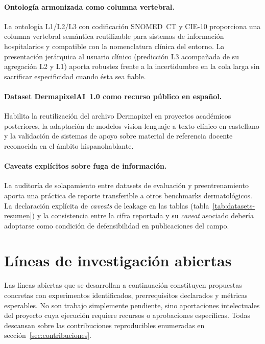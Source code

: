 \paragraph{Ontología armonizada como columna vertebral.}
La ontología L1/L2/L3 con codificación SNOMED~CT y CIE-10
proporciona una columna vertebral semántica reutilizable para
sistemas de información hospitalarios y compatible con la
nomenclatura clínica del entorno. La presentación jerárquica al
usuario clínico (predicción L3 acompañada de su agregación L2 y
L1) aporta robustez frente a la incertidumbre en la cola larga sin
sacrificar especificidad cuando ésta sea fiable.

\paragraph{Dataset DermapixelAI~1.0 como recurso público en español.}
Habilita la reutilización del archivo Dermapixel en proyectos
académicos posteriores, la adaptación de modelos vision-lenguaje a
texto clínico en castellano y la validación de sistemas de apoyo
sobre material de referencia docente reconocida en el ámbito
hispanohablante.

\paragraph{Caveats explícitos sobre fuga de información.}
La auditoría de solapamiento entre datasets de evaluación y
preentrenamiento aporta una práctica de reporte transferible a
otros benchmarks dermatológicos. La declaración explícita de
\emph{caveats} de leakage en las tablas
(tabla~\ref{tab:datasets-resumen}) y la consistencia entre la cifra
reportada y su \emph{caveat} asociado debería adoptarse como
condición de defensibilidad en publicaciones del campo.

\section{Líneas de investigación abiertas}
\label{sec:lineas-abiertas}

Las líneas abiertas que se desarrollan a continuación constituyen
propuestas concretas con experimentos identificados, prerrequisitos
declarados y métricas esperables. No son trabajo simplemente
pendiente, sino aportaciones intelectuales del proyecto cuya
ejecución requiere recursos o aprobaciones específicas. Todas
descansan sobre las contribuciones reproducibles enumeradas en
sección~\ref{sec:contribuciones}.

